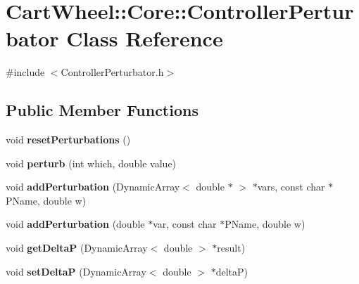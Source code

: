 \hypertarget{classCartWheel_1_1Core_1_1ControllerPerturbator}{
\section{CartWheel::Core::ControllerPerturbator Class Reference}
\label{classCartWheel_1_1Core_1_1ControllerPerturbator}
}


{\ttfamily \#include $<$ControllerPerturbator.h$>$}

\subsection*{Public Member Functions}
\begin{DoxyCompactItemize}
\item 
\hypertarget{classCartWheel_1_1Core_1_1ControllerPerturbator_ab4721ef490a94a378a7da3c9c4be447d}{
void {\bfseries resetPerturbations} ()}
\label{classCartWheel_1_1Core_1_1ControllerPerturbator_ab4721ef490a94a378a7da3c9c4be447d}

\item 
\hypertarget{classCartWheel_1_1Core_1_1ControllerPerturbator_a86718679f1a66a4dcb980ab96ce1c2e0}{
void {\bfseries perturb} (int which, double value)}
\label{classCartWheel_1_1Core_1_1ControllerPerturbator_a86718679f1a66a4dcb980ab96ce1c2e0}

\item 
\hypertarget{classCartWheel_1_1Core_1_1ControllerPerturbator_a07cbd1ebb67680d6e1739e79e1730e31}{
void {\bfseries addPerturbation} (DynamicArray$<$ double $\ast$ $>$ $\ast$vars, const char $\ast$PName, double w)}
\label{classCartWheel_1_1Core_1_1ControllerPerturbator_a07cbd1ebb67680d6e1739e79e1730e31}

\item 
\hypertarget{classCartWheel_1_1Core_1_1ControllerPerturbator_a36bef2d19c3f59651561296647e63965}{
void {\bfseries addPerturbation} (double $\ast$var, const char $\ast$PName, double w)}
\label{classCartWheel_1_1Core_1_1ControllerPerturbator_a36bef2d19c3f59651561296647e63965}

\item 
\hypertarget{classCartWheel_1_1Core_1_1ControllerPerturbator_a3d5b6ee5336f6699cd5d642276748eca}{
void {\bfseries getDeltaP} (DynamicArray$<$ double $>$ $\ast$result)}
\label{classCartWheel_1_1Core_1_1ControllerPerturbator_a3d5b6ee5336f6699cd5d642276748eca}

\item 
\hypertarget{classCartWheel_1_1Core_1_1ControllerPerturbator_a1ad76cedc4927e7e63109b500598d2cd}{
void {\bfseries setDeltaP} (DynamicArray$<$ double $>$ $\ast$deltaP)}
\label{classCartWheel_1_1Core_1_1ControllerPerturbator_a1ad76cedc4927e7e63109b500598d2cd}

\end{DoxyCompactItemize}
